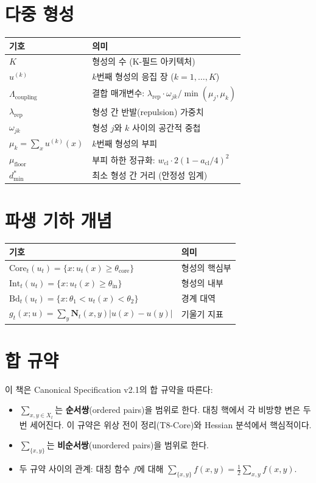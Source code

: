\section*{다중 형성}

\begin{tabular}{lp{11cm}}
\hline
\textbf{기호} & \textbf{의미} \\
\hline
$K$ & 형성의 수 (K-필드 아키텍처) \\
$u^{(k)}$ & $k$번째 형성의 응집 장 ($k = 1, \ldots, K$) \\
$\Lambda_{\mathrm{coupling}}$ & 결합 매개변수: $\lambda_{\mathrm{rep}} \cdot \omega_{jk} / \min(\mu_j, \mu_k)$ \\
$\lambda_{\mathrm{rep}}$ & 형성 간 반발(repulsion) 가중치 \\
$\omega_{jk}$ & 형성 $j$와 $k$ 사이의 공간적 중첩 \\
$\mu_k = \sum_x u^{(k)}(x)$ & $k$번째 형성의 부피 \\
$\mu_{\mathrm{floor}}$ & 부피 하한 정규화: $w_{\mathrm{cl}} \cdot 2(1 - a_{\mathrm{cl}}/4)^2$ \\
$d_{\min}^*$ & 최소 형성 간 거리 (안정성 임계) \\
\hline
\end{tabular}


\section*{파생 기하 개념}

\begin{tabular}{lp{11cm}}
\hline
\textbf{기호} & \textbf{의미} \\
\hline
$\mathrm{Core}_t(u_t) = \{x : u_t(x) \geq \theta_{\mathrm{core}}\}$ & 형성의 핵심부 \\
$\mathrm{Int}_t(u_t) = \{x : u_t(x) \geq \theta_{\mathrm{in}}\}$ & 형성의 내부 \\
$\mathrm{Bd}_t(u_t) = \{x : \theta_1 < u_t(x) < \theta_2\}$ & 경계 대역 \\
$g_t(x; u) = \sum_y \mathbf{N}_t(x,y)|u(x) - u(y)|$ & 기울기 지표 \\
\hline
\end{tabular}


\section*{합 규약}

이 책은 Canonical Specification v2.1의 합 규약을 따른다:

\begin{itemize}
    \item $\displaystyle\sum_{x,y \in X_t}$는 \textbf{순서쌍}(ordered pairs)을 범위로 한다. 대칭 핵에서 각 비방향 변은 두 번 세어진다. 이 규약은 위상 전이 정리(T8-Core)와 Hessian 분석에서 핵심적이다.
    \item $\displaystyle\sum_{\{x,y\}}$는 \textbf{비순서쌍}(unordered pairs)을 범위로 한다.
    \item 두 규약 사이의 관계: 대칭 함수 $f$에 대해 $\displaystyle\sum_{\{x,y\}} f(x,y) = \frac{1}{2}\sum_{x,y} f(x,y)$.
\end{itemize}

